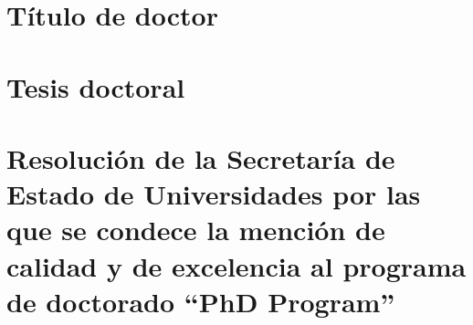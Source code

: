 
\cleardoublepage
\section{Título de doctor}

\cleardoublepage


\cleardoublepage
\section{Tesis doctoral}

\cleardoublepage


\cleardoublepage
\section{Resolución de la Secretaría de Estado de Universidades por las que se condece la mención de calidad y de excelencia al programa de doctorado ``PhD Program''}

\cleardoublepage

